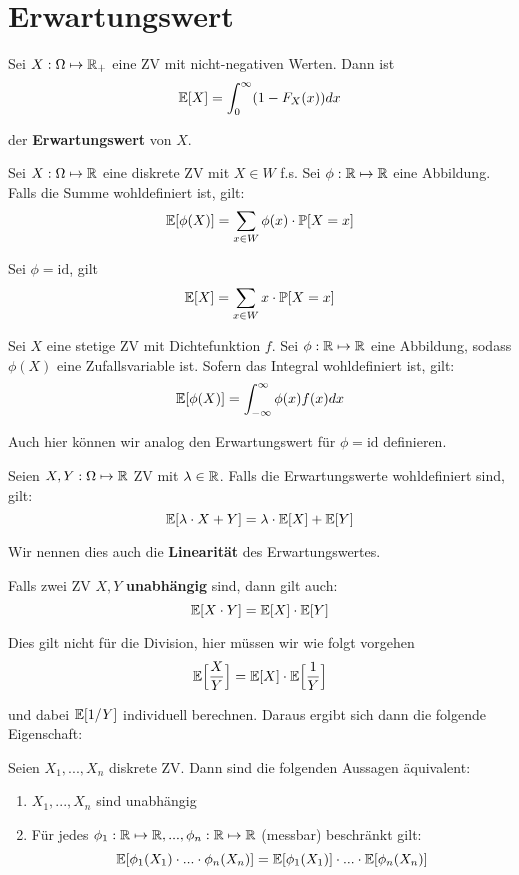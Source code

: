\section*{Erwartungswert}


Sei $X: \Omega \mapsto \mathbb{R}_+$ eine ZV mit nicht-negativen Werten. Dann ist 
$$\mathbb{E}[X] = \int_0^\infty (1 - F_X(x))dx$$
    
der \textbf{Erwartungswert} von $X$.



Sei $X: \Omega \mapsto \mathbb{R}$ eine diskrete ZV mit $X \in W$ f.s. Sei $\phi: \mathbb{R} \mapsto \mathbb{R}$ eine Abbildung. Falls die Summe wohldefiniert ist, gilt:
$$\mathbb{E}[\phi(X)] = \sum_{x \in W} \phi(x) \cdot \mathbb{P}[X = x]$$

Sei $\phi = \text{id}$, gilt 
$$\mathbb{E}[X] = \sum_{x \in W} x \cdot \mathbb{P}[X = x]$$



Sei $X$ eine stetige ZV mit Dichtefunktion $f$. Sei $\phi: \mathbb{R} \mapsto \mathbb{R}$ eine Abbildung, sodass $\phi(X)$ eine Zufallsvariable ist. Sofern das Integral wohldefiniert ist, gilt:
$$\mathbb{E}[\phi(X)] = \int_{-\infty}^\infty \phi(x)f(x)dx$$

 Auch hier können wir analog den Erwartungswert für $\phi = \text{id}$ definieren.



\begin{mainbox}{}
    Seien $X,Y: \Omega \mapsto \mathbb{R}$ ZV mit $\lambda \in \mathbb{R}$. Falls die Erwartungswerte wohldefiniert sind, gilt:    
    $$\mathbb{E}[\lambda \cdot X + Y] = \lambda \cdot \mathbb{E}[X] + \mathbb{E}[Y]$$
    
    Wir nennen dies auch die \textbf{Linearität} des Erwartungswertes.
\end{mainbox}

Falls zwei ZV $X,Y$ \textbf{unabhängig} sind, dann gilt auch:
$$\mathbb{E}[X \cdot Y] = \mathbb{E}[X] \cdot \mathbb{E}[Y]$$

Dies gilt nicht für die Division, hier müssen wir wie folgt vorgehen
$$\mathbb{E} \Big[ \frac{X}{Y} \Big] = \mathbb{E}[X] \cdot \mathbb{E} \Big[ \frac{1}{Y} \Big]$$

und dabei $\mathbb{E} [1 / Y]$ individuell berechnen. Daraus ergibt sich dann die folgende Eigenschaft:

\begin{mainbox}{}
    Seien $X_1,...,X_n$ diskrete ZV. Dann sind die folgenden Aussagen äquivalent:
    \begin{enumerate}
        \item $X_1,...,X_n$ sind unabhängig
        \item Für jedes $\phi_1: \mathbb{R} \mapsto \mathbb{R},..., \phi_n: \mathbb{R} \mapsto \mathbb{R}$ (messbar) beschränkt gilt:
        $$\mathbb{E}[\phi_1(X_1) \cdot ... \cdot \phi_n(X_n)] = \mathbb{E}[\phi_1(X_1)] \cdot ... \cdot \mathbb{E}[\phi_n(X_n)]$$
    \end{enumerate}
\end{mainbox}


